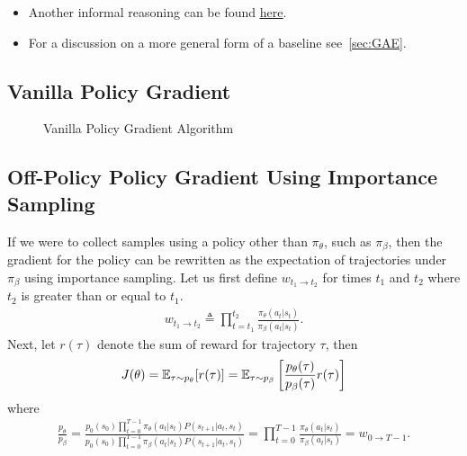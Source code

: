 \documentclass{article}
\begin{document}
\begin{itemize}
    \item Another informal reasoning can be found 
\href{https://danieltakeshi.github.io/2017/03/28/going-deeper-into-reinforcement-learning-fundamentals-of-policy-gradients/#:~:text=The%
}{\underline{here}}.
    \item For a discussion on a more general form of a baseline see~\cref{sec:GAE}.
\end{itemize}


\subsection{Vanilla Policy Gradient}

\begin{figure}[ht]
\caption{Vanilla Policy Gradient Algorithm}\label{fig:vanilla}
\end{figure} 

\subsection{Off-Policy Policy Gradient Using Importance Sampling}\label{sec:pg_off_policy}
If we were to collect samples using a policy other than $\pi_\theta$, such as $\pi_\beta$, then the gradient for the policy can be rewritten as the expectation of trajectories under $\pi_\beta$ using importance sampling. Let us first define $w_{t_1 \to t_2}$ for times $t_1$ and $t_2$ where $t_2$ is greater than or equal to $t_1$.
\begin{align}
w_{t_1 \to t_2} \triangleq \prod_{t= t_1}^{t_2}
    \frac{\pi_\theta(a_t \vert s_t)}{\pi_\beta(a_t \vert s_t)}.
\end{align}
Next, let $r(\tau)$ denote the sum of reward for trajectory $\tau$, then
\begin{align*}
    J(\theta) = {\mathbb E}_{\tau \sim p_\theta} [r(\tau)] = {\mathbb E}_{\tau \sim p_\beta} \left[\frac{p_\theta(\tau)}{p_\beta(\tau)} r(\tau) \right]
\end{align*}
where 
\begin{align*}
    \frac{p_\theta}{p_\beta} = \frac{p_0(s_0) \prod_{t=0}^{T-1}\pi_\theta(a_t \vert s_t) P(s_{t+1}\vert a_t, s_t)}{p_0(s_0) \prod_{t=0}^{T-1}\pi_\beta(a_t \vert s_t) P(s_{t+1}\vert a_t, s_t)} =
    \prod_{t=0}^{T-1}
    \frac{\pi_\theta(a_t \vert s_t)}{\pi_\beta(a_t \vert s_t)} = w_{0\to{T-1}}.
\end{align*}
\end{document}

